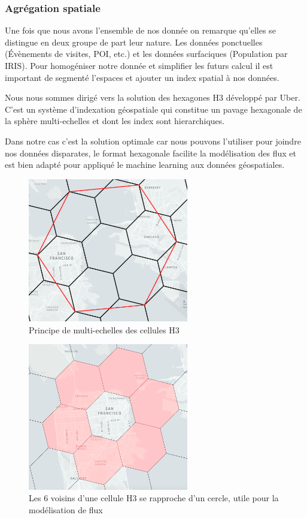 \subsubsection{Agrégation spatiale}

Une fois que nous avons l'ensemble de nos donnée on remarque qu'elles se distingue en deux groupe de part leur nature. Les données ponctuelles (\'Evènements de visites, POI, etc.) et les données surfaciques (Population par IRIS). Pour homogéniser notre donnée et simplifier les futurs calcul il est important de segmenté l'espaces et ajouter un index spatial à nos données.

Nous nous sommes dirigé vers la solution des hexagones H3 \cite{Uber_H3} développé par Uber. C'est un système d'indexation géospatiale qui constitue un pavage hexagonale de la sphère multi-echelles et dont les index sont hierarchiques.

Dans notre cas c'est la solution optimale car nous pouvons l'utiliser pour joindre nos données disparates, le format hexagonale facilite la modélisation des flux et est bien adapté pour appliqué le machine learning aux données géospatiales. 

\begin{figure}[H]
    \centering
    \includegraphics[width=7cm]{images/graphs/h3-multiscale.png}
    \caption{Principe de multi-echelles des cellules H3}
    \label{fig:celluleh3}
\end{figure}

\begin{figure}[H]
    \centering
    \includegraphics[width=7cm]{images/graphs/h3-ring.png}
    \captionsetup{justification=centering}
    \caption{Les 6 voisins d'une cellule H3 se rapproche d'un cercle, utile pour la modélisation de flux}
    \label{fig:celluleh3ring}
\end{figure}

